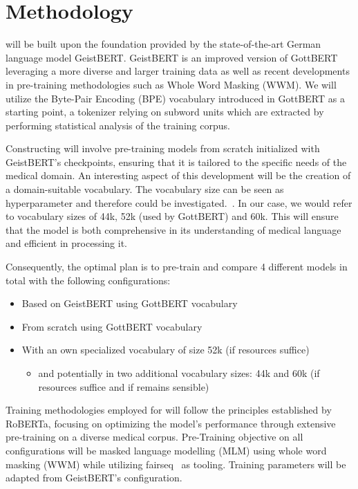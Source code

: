 \chapter*{Methodology}\label{chapter:methodology}

\ChristBERT{} will be built upon the foundation provided by the state-of-the-art
German language model GeistBERT. GeistBERT is an improved version of GottBERT
leveraging a more diverse and larger training data as well as recent
developments in pre-training methodologies such as Whole Word Masking (WWM). We
will utilize the Byte-Pair Encoding (BPE) vocabulary introduced in GottBERT as a
starting point, a tokenizer relying on subword units which are extracted by
performing statistical analysis of the training corpus.

Constructing \ChristBERT{} will involve pre-training models from scratch
initialized with GeistBERT's checkpoints, ensuring that it is tailored to the
specific needs of the medical domain. An interesting aspect of this development
will be the creation of a domain-suitable vocabulary. The vocabulary size can be
seen as hyperparameter and therefore could be
investigated.~\cite{toraman2023impact}. In our case, we would refer to
vocabulary sizes of 44k, 52k (used by GottBERT) and 60k. This will ensure that
the model is both comprehensive in its understanding of medical language and
efficient in processing it.

Consequently, the optimal plan is to pre-train and compare 4 different models in
total with the following configurations:

\begin{itemize}
    \item Based on GeistBERT using GottBERT vocabulary
    \item From scratch using GottBERT vocabulary
    \item With an own specialized vocabulary of size 52k (if resources suffice)
    \begin{itemize}
        \item and potentially in two additional vocabulary sizes: 44k and 60k
        (if resources suffice and if remains sensible)
    \end{itemize}
\end{itemize}

Training methodologies employed for \ChristBERT{} will follow the principles
established by RoBERTa, focusing on optimizing the model's performance through
extensive pre-training on a diverse medical corpus. Pre-Training objective on
all configurations will be masked language modelling (MLM) using whole word
masking (WWM) while utilizing fairseq~\cite{ott2019fairseq} as tooling. Training
parameters will be adapted from GeistBERT's configuration.

